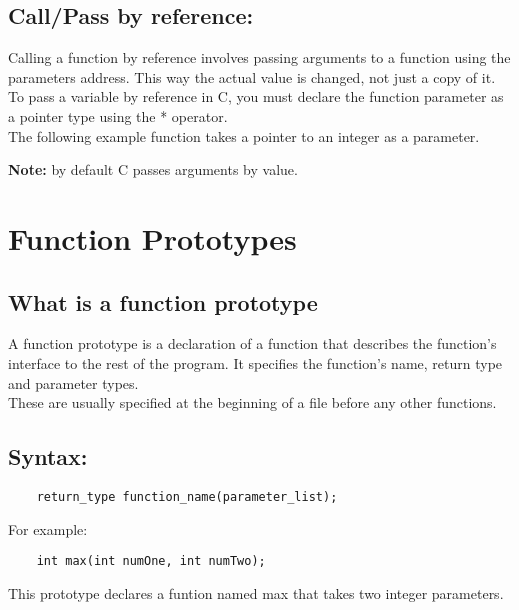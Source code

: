 \documentclass[12pt, letterpaper]{report}
\begin{document}
\subsection{Call/Pass by reference:}
Calling a function by reference involves passing arguments to a function using
the parameters address. This way the actual value is changed, not just a copy
of it.\\

To pass a variable by reference in C, you must declare the function parameter 
as a pointer type using the * operator.\\


The following example function takes a pointer to an integer as a parameter.

	

\textbf{Note:} by default C passes arguments by value.
\clearpage


\section{Function Prototypes}

\subsection{What is a function prototype}
A function prototype is a declaration of a function that describes the function's
interface to the rest of the program. It specifies the function's name, return
type and parameter types.\\

These are usually specified at the beginning of a file before any other functions.

\subsection*{Syntax:}
\begin{lstlisting}
	return_type function_name(parameter_list);
\end{lstlisting}

For example:
\begin{lstlisting}
	int max(int numOne, int numTwo);
\end{lstlisting}
This prototype declares a funtion named max that takes two integer parameters.
\end{document}
